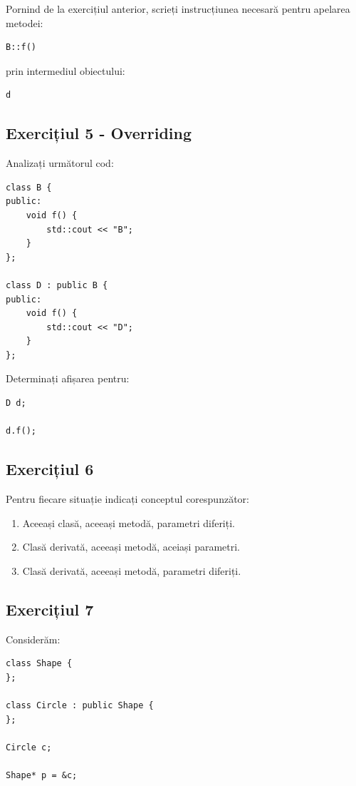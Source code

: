 \documentclass[12pt,a4paper]{article}
\begin{document}
Pornind de la exercițiul anterior, scrieți instrucțiunea necesară pentru apelarea metodei:

\begin{verbatim}
B::f()
\end{verbatim}

prin intermediul obiectului:

\begin{verbatim}
d
\end{verbatim}

\subsection{Exercițiul 5 - Overriding}

Analizați următorul cod:

\begin{verbatim}
class B {
public:
    void f() {
        std::cout << "B";
    }
};

class D : public B {
public:
    void f() {
        std::cout << "D";
    }
};
\end{verbatim}

Determinați afișarea pentru:

\begin{verbatim}
D d;

d.f();
\end{verbatim}

\subsection{Exercițiul 6}

Pentru fiecare situație indicați conceptul corespunzător:

\begin{enumerate}
\item Aceeași clasă, aceeași metodă, parametri diferiți.
\item Clasă derivată, aceeași metodă, aceiași parametri.
\item Clasă derivată, aceeași metodă, parametri diferiți.
\end{enumerate}

\subsection{Exercițiul 7}

Considerăm:

\begin{verbatim}
class Shape {
};

class Circle : public Shape {
};

Circle c;

Shape* p = &c;
\end{verbatim}
\end{document}

